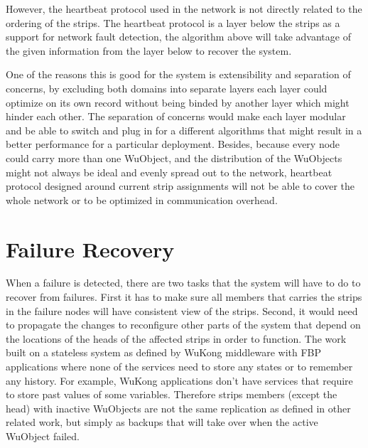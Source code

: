 However, the heartbeat protocol used in the network is not directly related to
the ordering of the strips. The heartbeat protocol is a layer below the strips
as a support for network fault detection, the algorithm above will take
advantage of the given information from the layer below to recover the system.

One of the reasons this is good for the system is extensibility and
separation of concerns, by excluding both domains into separate layers each
layer could optimize on its own record without being binded by another layer
which might hinder each other. The separation of concerns would make each layer
modular and be able to switch and plug in for a different algorithms that might
result in a better performance for a particular deployment. Besides, because
every node could carry more than one WuObject, and the distribution of the
WuObjects might not always be ideal and evenly spread out to the network,
heartbeat protocol designed around current strip assignments will not
be able to cover the whole network or to be optimized in communication overhead.

\section{Failure Recovery}
\label{s:fr}

When a failure is detected, there are two tasks that the system will have to do
to recover from failures. First it has to make sure all members that carries
the strips in the failure nodes will have consistent view of the strips.
Second, it would need to propagate the changes to reconfigure other parts of
the system that depend on the locations of the heads of the affected strips in
order to function. The work built on a stateless system as defined by WuKong
middleware with FBP applications where none of the services need to store any
states or to remember any history. For example, WuKong applications don't have
services that require to store past values of some variables. Therefore strips
members (except the head) with inactive WuObjects are not the same replication
as defined in other related work, but simply as backups that will take over
when the active WuObject failed.



